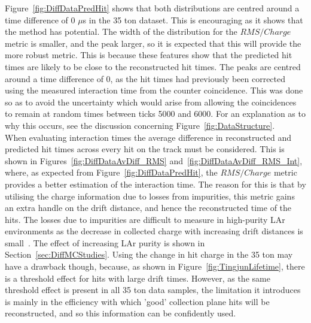 Figure~\ref{fig:DiffDataPredHit} shows that both distributions are centred around a time difference of 0 $\mu$s in the 35 ton dataset. This is encouraging as it shows that the method has potential. The width of the distribution for the $RMS/Charge$ metric is smaller, and the peak larger, so it is expected that this will provide the more robust metric. This is because these features show that the predicted hit times are likely to be close to the reconstructed hit times. The peaks are centred around a time difference of 0, as the hit times had previously been corrected using the measured interaction time from the counter coincidence. This was done so as to avoid the uncertainty which would arise from allowing the coincidences to remain at random times between ticks 5000 and 6000. For an explanation as to why this occurs, see the discussion concerning Figure~\ref{fig:DataStructure}. \\

When evaluating interaction times the average difference in reconstructed and predicted hit times across every hit on the track must be considered. This is shown in Figures~\ref{fig:DiffDataAvDiff_RMS} and~\ref{fig:DiffDataAvDiff_RMS_Int}, where, as expected from Figure~\ref{fig:DiffDataPredHit}, the $RMS/Charge$ metric provides a better estimation of the interaction time. The reason for this is that by utilising the charge information due to losses from impurities, this metric gains an extra handle on the drift distance, and hence the reconstructed time of the hits. The losses due to impurities are difficult to measure in high-purity LAr environments as the decrease in collected charge with increasing drift distances is small~\citep{LongBo}. The effect of increasing LAr purity is shown in Section~\ref{sec:DiffMCStudies}. Using the change in hit charge in the 35 ton may have a drawback though, because, as shown in Figure~\ref{fig:TingjunLifetime}, there is a threshold effect for hits with large drift times. However, as the same threshold effect is present in all 35 ton data samples, the limitation it introduces is mainly in the efficiency with which 'good' collection plane hits will be reconstructed, and so this information can be confidently used. \\

